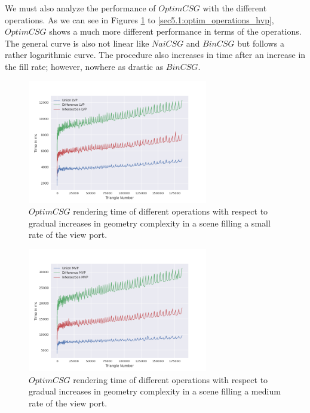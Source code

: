 \documentclass[a4paper,11pt,oneside]{article}
\begin{document}
We must also analyze the performance of $OptimCSG$ with the different operations. As we can see in Figures \ref{sec5.1:optim_operations_lvp} to \ref{sec5.1:optim_operations_hvp}, $OptimCSG$ shows a much more different performance in terms of the operations. The general curve is also not linear like $NaiCSG$ and $BinCSG$ but follows a rather logarithmic curve. The procedure also increases in time after an increase in the fill rate; however, nowhere as drastic as $BinCSG$.

\begin{figure}[H]
	\centering
	\includegraphics[width=0.7\textwidth]{section5/plots/optim_csg_lvp.png}
	\caption{$OptimCSG$ rendering time of different operations with respect to gradual increases in geometry complexity in a scene filling a small rate of the view port.}
	\label{sec5.1:optim_operations_lvp}
\end{figure}

\begin{figure}[H]
	\centering
	\includegraphics[width=0.7\textwidth]{section5/plots/optim_csg_mvp.png}
	\caption{$OptimCSG$ rendering time of different operations with respect to gradual increases in geometry complexity in a scene filling a medium rate of the view port.}
	\label{sec5.1:optim_operations_mvp}
\end{figure}
\end{document}
